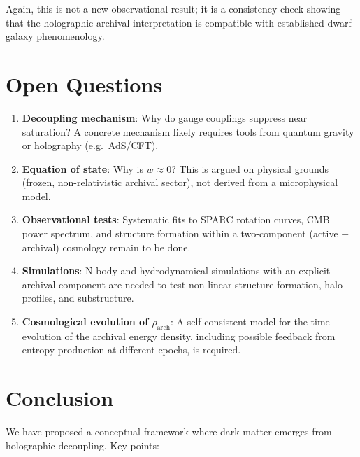 \documentclass[11pt,a4paper]{article}
\begin{document}
Again, this is not a new observational result; it is a consistency check showing that the holographic archival interpretation is compatible with established dwarf galaxy phenomenology.

\section{Open Questions}

\begin{enumerate}
\item \textbf{Decoupling mechanism}: Why do gauge couplings suppress near saturation? A concrete mechanism likely requires tools from quantum gravity or holography (e.g.\ AdS/CFT).

\item \textbf{Equation of state}: Why is $w \approx 0$? This is argued on physical grounds (frozen, non-relativistic archival sector), not derived from a microphysical model.

\item \textbf{Observational tests}: Systematic fits to SPARC rotation curves, CMB power spectrum, and structure formation within a two-component (active + archival) cosmology remain to be done.

\item \textbf{Simulations}: N-body and hydrodynamical simulations with an explicit archival component are needed to test non-linear structure formation, halo profiles, and substructure.

\item \textbf{Cosmological evolution of $\rho_{\mathrm{arch}}$}: A self-consistent model for the time evolution of the archival energy density, including possible feedback from entropy production at different epochs, is required.
\end{enumerate}

\section{Conclusion}

We have proposed a conceptual framework where dark matter emerges from holographic decoupling. Key points:
\end{document}
